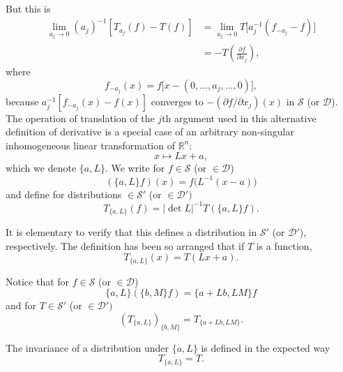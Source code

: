 But this is
\begin{equation*}
\begin{aligned}
  \lim_{a_j\to0}(a_j)^{-1}[T_{a_j}(f)-T(f)]
    &=\lim_{a_j\to0}T\bigl[a_j^{-1}(f_{-a_j}-f)\bigr]\\
    &=-T\left(\frac{\partial f}{\partial x_j}\right),
\end{aligned}
\end{equation*}
where
\begin{equation*}
  f_{-a_j}(x)=f\bigl[x-(0,\ldots,a_j,\ldots,0)\bigr],
\end{equation*}
because $a_j^{-1}[f_{-a_j}(x)-f(x)]$ converges to
$-(\partial f/\partial x_j)(x)$ in $\mathcal{S}$ (or $\mathcal{D}$). The
operation of translation of the $j$th argument used in this alternative
definition of derivative is a special case of an arbitrary non-singular
inhomogeneous linear transformation of $\mathbb{R}^n$:
\begin{equation*}
  x\longmapsto Lx+a,
\end{equation*}
which we denote $\{a,L\}$. We write for $f\in\mathcal{S}$ (or $\in\mathcal{D}$)
\begin{equation*}
  (\{a,L\}f)(x)=f\bigl(L^{-1}(x-a)\bigr)
\end{equation*}
and define for distributions $\in\mathcal{S}'$ (or $\in\mathcal{D}')$
\begin{equation*}
  T_{\{a,L\}}(f)=|\det L|^{-1}T(\{a,L\}f).
\end{equation*}

It is elementary to verify that this defines a distribution in $\mathcal{S}'$
(or $\mathcal{D}'$), respectively. The definition has been so arranged that if
$T$ is a function,
\begin{equation*}
  T_{\{a,L\}}(x)=T(Lx+a).
\end{equation*}

Notice that for $f\in\mathcal{S}$ (or $\in\mathcal{D}$)
\begin{equation*}
  \{a,L\}(\{b,M\}f)=\{a+Lb,LM\}f
\end{equation*}
and for $T\in\mathcal{S}'$ (or $\in\mathcal{D}')$
\begin{equation*}
  (T_{\{a,L\}})_{\{b,M\}}=T_{\{a+Lb,LM\}}.
\end{equation*}

The invariance of a distribution under $\{a,L\}$ is defined in the expected
way
\begin{equation*}
  T_{\{a,L\}}=T.
\end{equation*}

